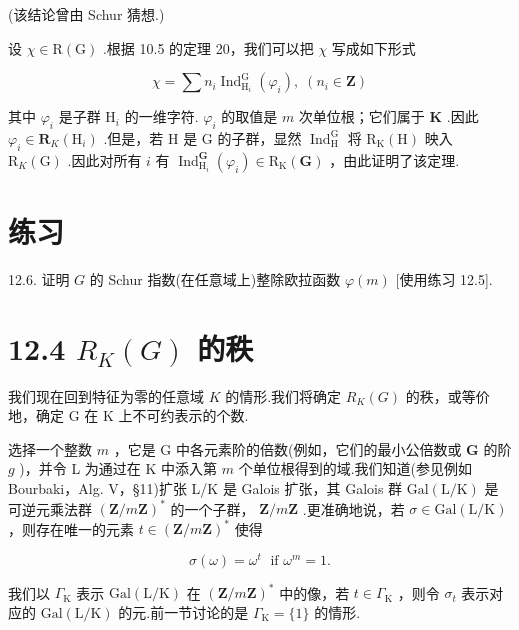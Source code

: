 \documentclass[10pt]{article}
\begin{document}
(该结论曾由 Schur 猜想.)

设 \(\chi  \in  \mathrm{R}\left( \mathrm{G}\right)\) .根据 10.5 的定理 20，我们可以把 \(\chi\) 写成如下形式

\[
\chi  = \sum {n}_{i}{\operatorname{Ind}}_{{\mathrm{H}}_{i}}^{\mathrm{G}}\left( {\varphi }_{i}\right) ,\;\left( {{n}_{i} \in  \mathbf{Z}}\right)
\]

其中 \({\varphi }_{i}\) 是子群 \({\mathrm{H}}_{i}\) 的一维字符. \({\varphi }_{i}\) 的取值是 \(m\) 次单位根；它们属于 \(\mathbf{K}\) .因此 \({\varphi }_{i} \in  {\mathbf{R}}_{K}\left( {\mathrm{H}}_{i}\right)\) .但是，若 \(\mathrm{H}\) 是 \(\mathrm{G}\) 的子群，显然 \({\operatorname{Ind}}_{\mathrm{H}}^{\mathrm{G}}\) 将 \({\mathrm{R}}_{\mathrm{K}}\left( \mathrm{H}\right)\) 映入 \({\mathrm{R}}_{K}\left( \mathrm{G}\right)\) .因此对所有 \(i\) 有 \({\operatorname{Ind}}_{{\mathrm{H}}_{i}}^{\mathbf{G}}\left( {\varphi }_{i}\right)  \in  {\mathrm{R}}_{\mathrm{K}}\left( \mathbf{G}\right)\) ，由此证明了该定理.

\section*{练习}

12.6. 证明 \(G\) 的 Schur 指数(在任意域上)整除欧拉函数 \(\varphi \left( m\right)\) [使用练习 12.5].

\section*{12.4 \({R}_{K}\left( G\right)\) 的秩}

我们现在回到特征为零的任意域 \(K\) 的情形.我们将确定 \({R}_{K}\left( G\right)\) 的秩，或等价地，确定 \(\mathrm{G}\) 在 \(\mathrm{K}\) 上不可约表示的个数.

选择一个整数 \(m\) ，它是 G 中各元素阶的倍数(例如，它们的最小公倍数或 \(\mathbf{G}\) 的阶 \(g\) )，并令 L 为通过在 \(\mathrm{K}\) 中添入第 \(m\) 个单位根得到的域.我们知道(参见例如 Bourbaki，Alg. V，§11)扩张 L/K 是 Galois 扩张，其 Galois 群 \(\mathrm{{Gal}}\left( {\mathrm{L}/\mathrm{K}}\right)\) 是可逆元乘法群 \({\left( \mathbf{Z}/m\mathbf{Z}\right) }^{ * }\) 的一个子群， \(\mathbf{Z}/m\mathbf{Z}\) .更准确地说，若 \(\sigma  \in  \mathrm{{Gal}}\left( {\mathrm{L}/\mathrm{K}}\right)\) ，则存在唯一的元素 \(t \in  {\left( \mathbf{Z}/m\mathbf{Z}\right) }^{ * }\) 使得

\[
\sigma \left( \omega \right)  = {\omega }^{t}\;\text{ if }{\omega }^{m} = 1.
\]

我们以 \({\Gamma }_{\mathrm{K}}\) 表示 \(\mathrm{{Gal}}\left( {\mathrm{L}/\mathrm{K}}\right)\) 在 \({\left( \mathbf{Z}/m\mathbf{Z}\right) }^{ * }\) 中的像，若 \(t \in  {\Gamma }_{\mathrm{K}}\) ，则令 \({\sigma }_{t}\) 表示对应的 \(\mathrm{{Gal}}\left( {\mathrm{L}/\mathrm{K}}\right)\) 的元.前一节讨论的是 \({\Gamma }_{\mathrm{K}} = \{ 1\}\) 的情形.
\end{document}
